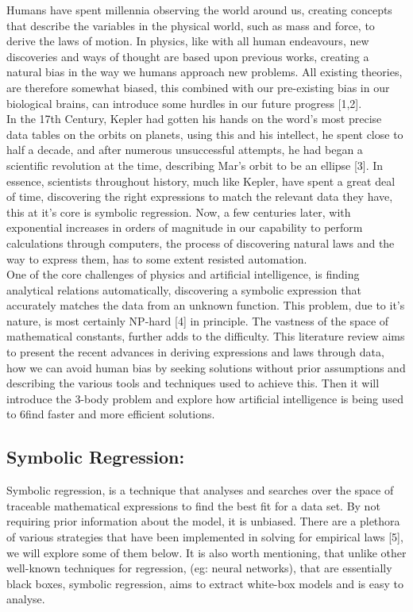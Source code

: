 \documentclass{article}
\begin{document}
Humans have spent millennia observing the world around us, creating concepts that describe the variables in the physical world, such as mass and force, to derive the laws of motion. In physics, like with
all human endeavours, new discoveries and ways of thought are based upon previous works, creating
a natural bias in the way we humans approach new problems. All existing theories, are therefore
somewhat biased, this combined with our pre-existing bias in our biological brains, can introduce some
hurdles in our future progress [1,2].\\

In the 17th Century, Kepler had gotten his hands on the word’s most precise data tables on the orbits
on planets, using this and his intellect, he spent close to half a decade, and after numerous unsuccessful
attempts, he had began a scientific revolution at the time, describing Mar’s orbit to be an ellipse [3].
In essence, scientists throughout history, much like Kepler, have spent a great deal of time, discovering
the right expressions to match the relevant data they have, this at it’s core is symbolic regression. Now,
a few centuries later, with exponential increases in orders of magnitude in our capability to perform
calculations through computers, the process of discovering natural laws and the way to express them,
has to some extent resisted automation.\\


One of the core challenges of physics and artificial intelligence, is finding analytical relations automatically, discovering a symbolic expression that accurately matches the data from an unknown function.
This problem, due to it’s nature, is most certainly NP-hard [4] in principle. The vastness of the space
of mathematical constants, further adds to the difficulty. This literature review aims to present the recent advances in deriving expressions and laws through data, how we can avoid human bias by seeking
solutions without prior assumptions and describing the various tools and techniques used to achieve
this. Then it will introduce the 3-body problem and explore how artificial intelligence is being used to
6find faster and more efficient solutions.\\


\subsection{Symbolic Regression: }

Symbolic regression, is a technique that analyses and searches over the space of traceable mathematical
expressions to find the best fit for a data set. By not requiring prior information about the model,
it is unbiased. There are a plethora of various strategies that have been implemented in solving for
empirical laws [5], we will explore some of them below. It is also worth mentioning, that unlike other
well-known techniques for regression, (eg: neural networks), that are essentially black boxes, symbolic
regression, aims to extract white-box models and is easy to analyse.\\
\end{document}
